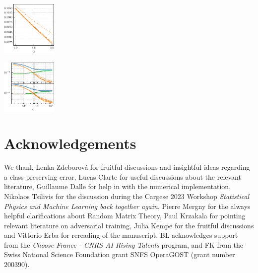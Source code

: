 \documentclass[a0paper,fleqn]{betterportraitposter}
\theoremstyle{plain}
\theoremstyle{definition}
\theoremstyle{remark}
\begin{document}
{\begin{multicols}{3}
\includegraphics[width=0.2\textwidth]{Assets/gen_lambda_optimal_sweep_alpha.pdf}


\includegraphics[width=0.2\textwidth]{Assets/effective_regularisation.pdf}

\section{Acknowledgements}

We thank Lenka Zdeborov\'a for fruitful discussions and insightful ideas regarding a class-preserving error, Lucas Clarte for useful discussions about the relevant literature, Guillaume Dalle for help in with the numerical implementation, Nikolaos Tsilivis for the discussion during the Cargese 2023 Workshop {\it Statistical Physics and Machine Learning back together again}, Pierre Mergny for the always helpful clarifications about Random Matrix Theory, Paul Krzakala for pointing relevant literature on adversarial training, Julia Kempe for the fruitful discussions and Vittorio Erba for rereading of the manuscript. BL acknowledges support from the \textit{Choose France - CNRS AI Rising Talents} program, and FK from the Swiss National Science Foundation grant SNFS OperaGOST  (grant number $200390$).





\columnbreak

\end{multicols}
}





\end{document}
